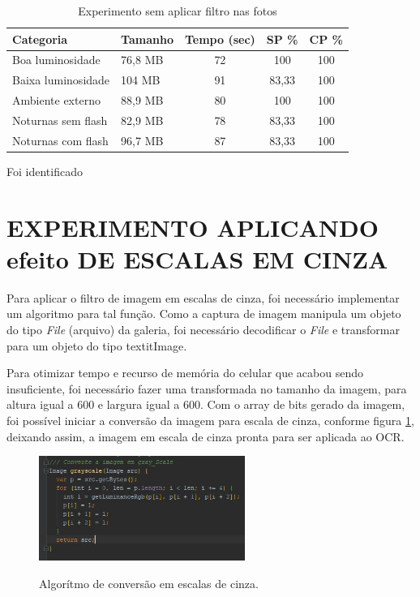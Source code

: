 \begin{table}[]
\caption{Experimento sem aplicar filtro nas fotos}
\label{tab:exp_sem_filtro}
\centering
\begin{tabular}{llccc}
\hline
Categoria          & Tamanho    & Tempo (sec) & SP \%  & CP \% \\ \hline
Boa luminosidade   & 76,8 MB & 72     & 100 & 100         \\
Baixa luminosidade & 104 MB & 91     & 83,33 & 100         \\
Ambiente externo   & 88,9 MB & 80     & 100 & 100         \\
Noturnas sem flash & 82,9 MB & 78     & 83,33& 100         \\
Noturnas com flash & 96,7 MB & 87     & 83,33 & 100         \\ \hline
\end{tabular}
	\label{fig:exp_sem_filtro}
\end{table}

Foi identificado 


\section{EXPERIMENTO APLICANDO efeito DE ESCALAS EM CINZA}
Para aplicar o filtro de imagem em escalas de cinza, foi necessário implementar um algoritmo para tal função. Como a captura de imagem manipula um objeto do tipo \textit{File} (arquivo) da galeria, foi necessário decodificar o \textit{File} e transformar para um objeto do tipo textit{Image}. 

Para otimizar tempo e recurso de memória do celular que acabou sendo insuficiente, foi necessário fazer uma transformada no tamanho da imagem, para altura igual a 600 e largura igual a 600. Com o array de bits gerado da imagem, foi possível iniciar a conversão da imagem para escala de cinza, conforme figura \ref{fig:greyscale}, deixando assim, a imagem em escala de cinza pronta para ser aplicada ao OCR.



 \begin{figure}[h]
	\centering
	\includegraphics[width=0.6\textwidth]{Imagens/greyscale.JPG} %
	\caption[Algorítmo de conversão em escalas de cinza.]{Algorítmo de conversão em escalas de cinza.}
	\label{fig:greyscale}
\end{figure}


